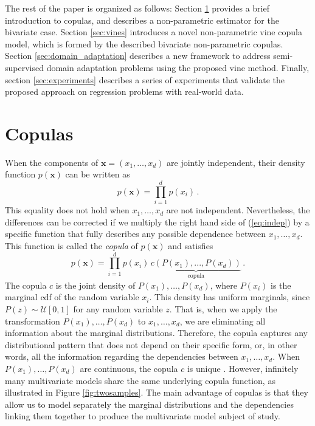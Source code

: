 \documentclass{article}
\begin{document}
The rest of the paper is organized as follows: Section \ref{sec:copulas}
provides a brief introduction to copulas, and describes a non-parametric
estimator for the bivariate case.  Section \ref{sec:vines} introduces a novel
non-parametric vine copula model, which is formed by the
described bivariate non-parametric copulas.  Section
\ref{sec:domain_adaptation} describes a new framework to address
semi-supervised domain adaptation problems using the proposed vine method.
Finally, section \ref{sec:experiments} describes a series of experiments that
validate the proposed approach on regression problems with real-world data.

\section{Copulas}\label{sec:copulas}
When the components of $\mathbf{x}=(x_1,\ldots,x_d)$ are jointly independent,
their density function $p(\mathbf{x})$ can be written as
\begin{equation}
p(\mathbf{x}) = \prod_{i=1}^{d} p(x_i)\,. \label{eq:indep}
\end{equation}
This equality does not hold when $x_1,\ldots,x_d$ are not independent.
Nevertheless, the differences can be corrected if we multiply the right hand
side of (\ref{eq:indep}) by a specific function that fully describes any
possible dependence between $x_1,\ldots,x_d$. This function is called the
\emph{copula} of $p(\mathbf{x})$ \cite{nelsen} and satisfies
\begin{equation}
p(\mathbf{x}) = \prod_{i=1}^{d} p(x_i) \, \underbrace{c(P(x_1),...,
P(x_d))}_\text{copula}\,.\label{eq:copulaDensity}
\end{equation}
The copula $c$ is the joint density of $P(x_1),\ldots,P(x_d)$, where $P(x_i)$
is the marginal cdf of the random variable $x_i$.  This density has uniform
marginals, since $P(z) \sim \mathcal{U}[0,1]$ for any random variable $z$.
That is, when we apply the transformation $P(x_1),\ldots,P(x_d)$ to
$x_1,\ldots,x_d$, we are eliminating all information about the marginal
distributions.  Therefore, the copula captures any distributional pattern that
does not depend on their specific form, or, in other words, all the information
regarding the dependencies between $x_1,\ldots,x_d$.  When
$P(x_1),\ldots,P(x_d)$ are continuous, the copula $c$ is unique \cite{sklar}.
However, infinitely many multivariate models share the same underlying
copula function, as illustrated in Figure \ref{fig:twosamples}.  The main
advantage of copulas is that they allow us to model separately the marginal
distributions and the dependencies linking them together to produce the multivariate
model subject of study.
\end{document}
